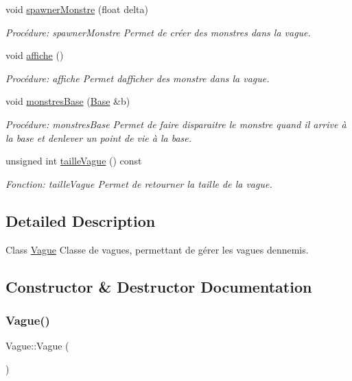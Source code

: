 \begin{DoxyCompactItemize}
void \hyperlink{classVague_a08f321266ddbf3e852b9d48975849f98}{spawner\+Monstre} (float delta)
\begin{DoxyCompactList}\small\item\em Procédure\+: spawner\+Monstre Permet de créer des monstres dans la vague. \end{DoxyCompactList}\item 
void \hyperlink{classVague_adec201ad91a86f65bf6aaf0ddb73bd20}{affiche} ()
\begin{DoxyCompactList}\small\item\em Procédure\+: affiche Permet d\textquotesingle{}afficher des monstre dans la vague. \end{DoxyCompactList}\item 
void \hyperlink{classVague_ad9d543a1eafc579d8a4de88d278a53a7}{monstres\+Base} (\hyperlink{classBase}{Base} \&b)
\begin{DoxyCompactList}\small\item\em Procédure\+: monstres\+Base Permet de faire disparaitre le monstre quand il arrive à la base et d\textquotesingle{}enlever un point de vie à la base. \end{DoxyCompactList}\item 
unsigned int \hyperlink{classVague_a00fd363241fbfd6ed6819d408155a6ee}{taille\+Vague} () const
\begin{DoxyCompactList}\small\item\em Fonction\+: taille\+Vague Permet de retourner la taille de la vague. \end{DoxyCompactList}\end{DoxyCompactItemize}


\subsection{Detailed Description}
Class \hyperlink{classVague}{Vague} Classe de vagues, permettant de gérer les vagues d\textquotesingle{}ennemis. 

\subsection{Constructor \& Destructor Documentation}
\mbox{\label{classVague_ab1e4786aa02ad641431b56658dbbaac3}} 
\subsubsection{\texorpdfstring{Vague()}{Vague()}\hspace{0.1cm}{\footnotesize\ttfamily [1/3]}}
{\footnotesize\ttfamily Vague\+::\+Vague (\begin{DoxyParamCaption}{ }\end{DoxyParamCaption})}



